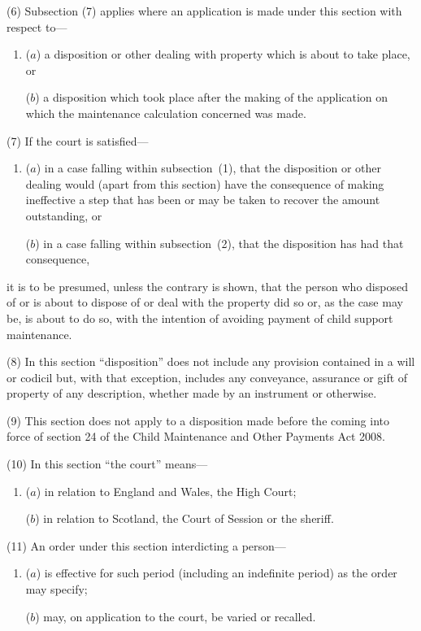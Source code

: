 \documentclass[12pt,a4paper]{article}
\begin{document}
(6)
Subsection (7) applies where an application is made under this section with respect to---
\begin{enumerate}\item[]
($a$) a disposition or other dealing with property which is about to take place, or

($b$) a disposition which took place after the making of the application on which the maintenance calculation concerned was made.
\end{enumerate}

(7) If the court is satisfied---
\begin{enumerate}\item[]
($a$) in a case falling within subsection~(1), that the disposition or other dealing would (apart from this section) have the consequence of making ineffective a step that has been or may be taken to recover the amount outstanding, or

($b$) in a case falling within subsection~(2), that the disposition has had that consequence,
\end{enumerate}
it is to be presumed, unless the contrary is shown, that the person who disposed of or is about to dispose of or deal with the property did so or, as the case may be, is about to do so, with the intention of avoiding payment of child support maintenance.

(8)
In this section ``disposition'' does not include any provision contained in a will or codicil but, with that exception, includes any conveyance, assurance or gift of property of any description, whether made by an instrument or otherwise.

(9)
This section does not apply to a disposition made before the coming into force of section 24 of the Child Maintenance and Other Payments Act 2008.

(10)
In this section ``the court'' means---
\begin{enumerate}\item[]
($a$) in relation to England and Wales, the High Court;

($b$) in relation to Scotland, the Court of Session or the sheriff.
\end{enumerate}

(11) An order under this section interdicting a person---
\begin{enumerate}\item[]
($a$) is effective for such period (including an indefinite period) as the order may specify;

($b$) may, on application to the court, be varied or recalled.
\end{enumerate}
\end{document}
